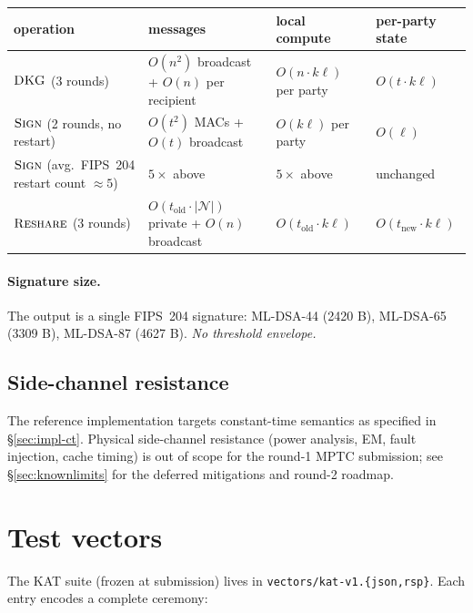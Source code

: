 \documentclass[11pt,a4paper]{article}
\theoremstyle{definition}
\theoremstyle{remark}
\newcommand{\Sign}{\textsc{Sign}}
\newcommand{\DKG}{\textsc{DKG}}
\newcommand{\Reshare}{\textsc{Reshare}}
\begin{document}
\begin{center}
\begin{tabular}{l l l l}
\toprule
operation & messages & local compute & per-party state \\
\midrule
$\DKG$ (3 rounds)
& $O(n^2)$ broadcast + $O(n)$ per recipient
& $O(n \cdot k \ell)$ per party
& $O(t \cdot k \ell)$ \\
$\Sign$ (2 rounds, no restart)
& $O(t^2)$ MACs + $O(t)$ broadcast
& $O(k \ell)$ per party
& $O(\ell)$ \\
$\Sign$ (avg.\ FIPS~204 restart count $\approx 5$)
& $5 \times$ above
& $5 \times$ above
& unchanged \\
$\Reshare$ (3 rounds)
& $O(t_{\mathrm{old}} \cdot |\mathcal{N}|)$ private + $O(n)$ broadcast
& $O(t_{\mathrm{old}} \cdot k \ell)$
& $O(t_{\mathrm{new}} \cdot k \ell)$ \\
\bottomrule
\end{tabular}
\end{center}

\paragraph{Signature size.} The output is a single FIPS~204
signature: ML-DSA-44 (2420 B), ML-DSA-65 (3309 B), ML-DSA-87
(4627 B). \emph{No threshold envelope.}

\subsection{Side-channel resistance}
\label{sec:impl-sidechannel}

The reference implementation targets constant-time semantics as
specified in \S\ref{sec:impl-ct}. Physical side-channel resistance
(power analysis, EM, fault injection, cache timing) is out of scope
for the round-1 MPTC submission; see
\S\ref{sec:knownlimits} for the deferred mitigations and round-2
roadmap.

\section{Test vectors}
\label{sec:vectors}

The KAT suite (frozen at submission) lives in
\texttt{vectors/kat-v1.\{json,rsp\}}. Each entry encodes a complete
ceremony:
\end{document}
